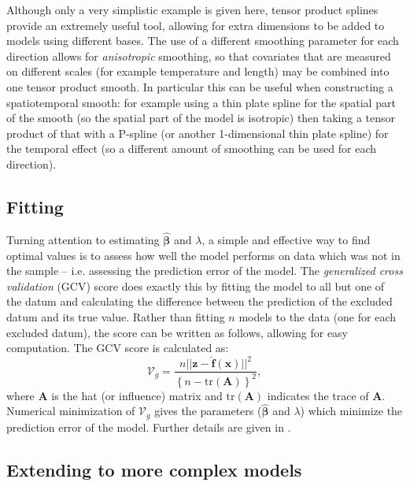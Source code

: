 Although only a very simplistic example is given here, tensor product splines provide an extremely useful tool, allowing for extra dimensions to be added to models using different bases. The use of a different smoothing parameter for each direction allows for \textit{anisotropic} smoothing, so that covariates that are measured on different scales (for example temperature and length) may be combined into one tensor product smooth. In particular this can be useful when constructing a spatiotemporal smooth: for example using a thin plate spline for the spatial part of the smooth (so the spatial part of the model is isotropic) then taking a tensor product of that with a P-spline (or another 1-dimensional thin plate spline) for the temporal effect (so a different amount of smoothing can be used for each direction).

\subsection{Fitting}
\label{GAMfitting}

Turning attention to estimating $\bm{\hat{\beta}}$ and $\lambda$, a simple and effective way to find optimal values is to assess how well the model performs on data which was not in the sample -- i.e. assessing the prediction error of the model. The \textit{generalized cross validation} (GCV) score does exactly this by fitting the model to all but one of the datum and calculating the difference between the prediction of the excluded datum and its true value. Rather than fitting $n$ models to the data (one for each excluded datum), the score can be written as follows, allowing for easy computation. The GCV score is calculated as:
\begin{equation}
\mathcal{V}_g = \frac{n \lvert\lvert \mathbf{z} - \mathbf{\hat{f}}(\mathbf{x})\rvert \rvert^2}{\left \{n-\text{tr}(\mathbf{A}) \right \}^2},
\label{intro-GCV}
\end{equation}
where $\mathbf{A}$ is the hat (or influence) matrix and $\text{tr}(\mathbf{A})$ indicates the trace of $\mathbf{A}$. Numerical minimization of $\mathcal{V}_g$ gives the parameters ($\bm{\hat{\beta}}$ and $\lambda$) which minimize the prediction error of the model. Further details are given in . 



\subsection{Extending to more complex models}
\label{intro-extending}

